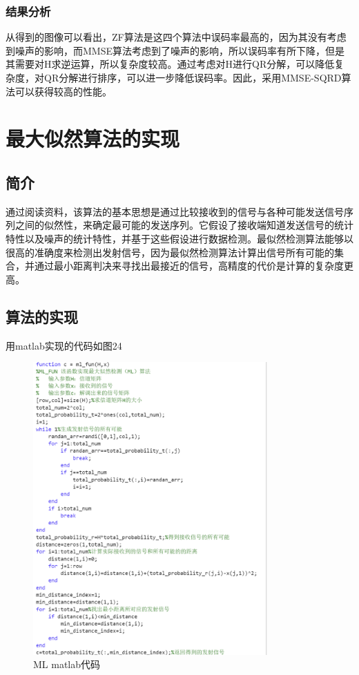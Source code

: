 \documentclass[a4paper,12pt]{article}
\begin{document}
	\subsubsection{结果分析}
	从得到的图像可以看出，ZF算法是这四个算法中误码率最高的，因为其没有考虑到噪声的影响，而MMSE算法考虑到了噪声的影响，所以误码率有所下降，但是其需要对H求逆运算，所以复杂度较高。通过考虑对H进行QR分解，可以降低复杂度，对QR分解进行排序，可以进一步降低误码率。因此，采用MMSE-SQRD算法可以获得较高的性能。
	\section{最大似然算法的实现}
	\subsection{简介}
	通过阅读资料，该算法的基本思想是通过比较接收到的信号与各种可能发送信号序列之间的似然性，来确定最可能的发送序列。它假设了接收端知道发送信号的统计特性以及噪声的统计特性，并基于这些假设进行数据检测。最似然检测算法能够以很高的准确度来检测出发射信号，因为最似然检测算法计算出信号所有可能的集合，并通过最小距离判决来寻找出最接近的信号，高精度的代价是计算的复杂度更高。
	\subsection{算法的实现}
	用matlab实现的代码如图24
	\begin{figure}[h]
		\centering
		\includegraphics[width=0.8\textwidth]{25.png}
		\caption{ML matlab代码}
	\end{figure}
\end{document}
